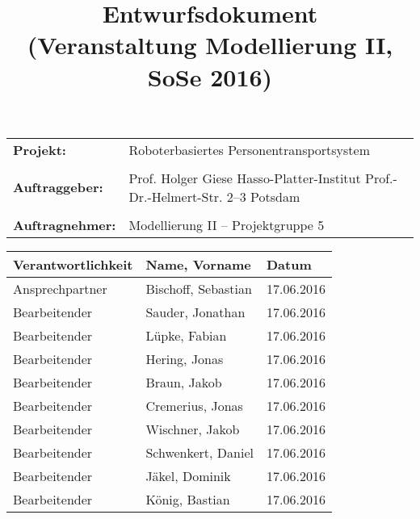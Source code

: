 \documentclass[includeheaders]{scrartcl}
\begin{document}
	
	
	
	\newpage
	
	\title{Entwurfsdokument\\ \small{(Veranstaltung Modellierung II, SoSe 2016)}}
	\date{}
	\author{}
	
	\maketitle
	\begin{table}[H]
		\centering
		\begin{tabular}{lp{7.5cm}}
			\textbf{Projekt:} & Roboterbasiertes Personentransportsystem\\
			&\\
			\textbf{Auftraggeber: }& Prof. Holger Giese \newline Hasso-Platter-Institut \newline Prof.-Dr.-Helmert-Str. 2–3 \newline 14482 Potsdam\\
			&\\
			\textbf{Auftragnehmer: }& Modellierung II – Projektgruppe 5 \\
		\end{tabular}
	\end{table}
	
	
	
	\newpage
	
	\begin{table}[H]
		\centering
		\begin{tabularx}{\textwidth}{|p{4cm}|X|p{4cm}|}
			\hline
			Verantwortlichkeit & Name, Vorname & Datum \\ \hline
			Ansprechpartner    & Bischoff, Sebastian & 17.06.2016 \\
			Bearbeitender      & Sauder, Jonathan & 17.06.2016 \\ 
			Bearbeitender      & Lüpke, Fabian & 17.06.2016 \\ 
			Bearbeitender      & Hering, Jonas & 17.06.2016 \\
			Bearbeitender      & Braun, Jakob & 17.06.2016  \\
			Bearbeitender      & Cremerius, Jonas & 17.06.2016 \\
			Bearbeitender      & Wischner, Jakob & 17.06.2016 \\
			Bearbeitender      & Schwenkert, Daniel & 17.06.2016 \\
			Bearbeitender      & Jäkel, Dominik & 17.06.2016 \\
			Bearbeitender      & König, Bastian & 17.06.2016 \\ \hline
		\end{tabularx}
	\end{table}
	
	\newpage
	
	\tableofcontents

\newpage

\newpage

\newpage

\newpage

\newpage

\newpage

\newpage

\newpage

\newpage

\end{document}
